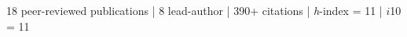 \documentclass[11pt,a4paper]{article}
\begin{document}



%
\begin{center}
	18 peer-reviewed publications | 8 lead-author | 390+ citations | {\it h}-index = 11 | $i$10 = 11 
\end{center}

\end{document}
